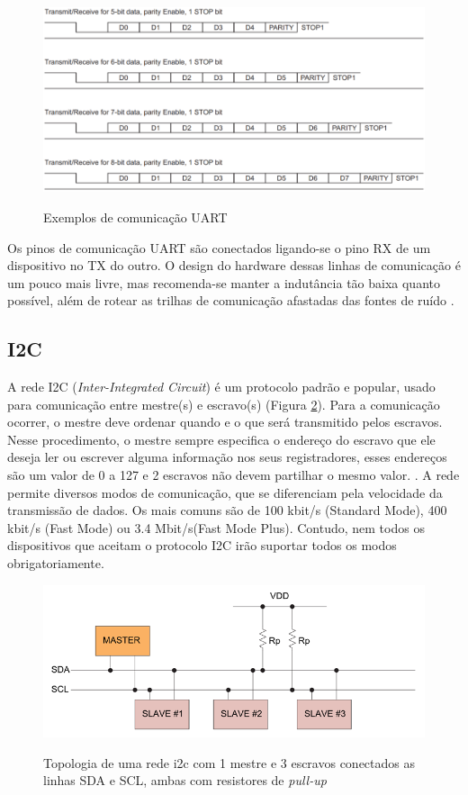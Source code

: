 \begin{figure}[!htb]
	\centering
	\caption{Exemplos de comunicação UART}
	\includegraphics[width=\linewidth]{figuras/uartcommunication}
	\label{fig:uartcommunication}
\end{figure}

Os pinos de comunicação UART são conectados ligando-se o pino RX de um dispositivo no TX do outro. O design do hardware dessas linhas de comunicação é um pouco mais livre, mas recomenda-se manter a indutância tão baixa quanto possível, além de rotear as trilhas de comunicação afastadas das fontes de ruído \cite{site:altiumpcb}.

\subsection{I2C}

A rede I2C (\textit{Inter-Integrated Circuit}) é um protocolo padrão e popular, usado para comunicação entre mestre(s) e escravo(s) (Figura \ref{fig:i2connection}). 
Para a comunicação ocorrer, o mestre deve ordenar quando e o que será transmitido pelos escravos. Nesse procedimento, o mestre sempre especifica o endereço do escravo que ele deseja ler ou escrever alguma informação nos seus registradores, esses endereços são um valor de 0 a 127 e 2 escravos não devem partilhar o mesmo valor. \cite{man:texasI2C}. A rede permite diversos modos de comunicação, que se diferenciam pela velocidade da transmissão de dados. Os mais comuns são de 100 kbit/s (Standard Mode), 400 kbit/s (Fast Mode) ou 3.4 Mbit/s(Fast Mode Plus). Contudo, nem todos os dispositivos que aceitam o protocolo I2C irão suportar todos os modos obrigatoriamente.

\begin{figure}[!htb]
	\centering
	\caption{Topologia de uma rede i2c com 1 mestre e 3 escravos conectados as linhas SDA e SCL, ambas com resistores de \textit{pull-up}}
	\includegraphics[width=0.7\linewidth]{figuras/i2connection}
	\label{fig:i2connection}
\end{figure}

